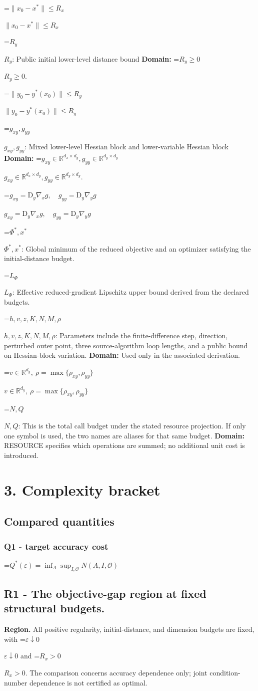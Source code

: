 \documentclass[10pt,a4paper]{article}
\newcommand{\AtlasMath}[1]{\par\begingroup\centering\setbox0=\hbox{$\displaystyle #1$}\ifdim\wd0>1.4\linewidth\typeout{ATLAS WIDE FORMULA: \the\wd0}\fi\ifdim\wd0>\linewidth\resizebox{\linewidth}{!}{\box0}\else\box0\fi\par\endgroup}
\newcommand{\AtlasInlineMath}[1]{\begingroup\setbox0=\hbox{$#1$}\ifdim\wd0>.4\linewidth\endgroup\AtlasMath{#1}\else\endgroup$#1$\fi}
\begin{document}
\AtlasInlineMath{\|x_0-x^*\|\le R_x}

\AtlasInlineMath{R_y}: Public initial lower-level distance bound \textbf{Domain:} \AtlasInlineMath{R_y\ge0}.

\AtlasInlineMath{\|y_0-y^*(x_0)\|\le R_y}

\AtlasInlineMath{g_{xy},g_{yy}}: Mixed lower-level Hessian block and lower-variable Hessian block \textbf{Domain:} \AtlasInlineMath{g_{xy}\in\mathbb R^{d_x\times d_y},g_{yy}\in\mathbb R^{d_y\times d_y}}.

\AtlasInlineMath{g_{xy}=\mathrm D_y\nabla_xg,\quad g_{yy}=\mathrm D_y\nabla_yg}

\AtlasInlineMath{\Phi^*,x^*}: Global minimum of the reduced objective and an optimizer satisfying the initial-distance budget.

\AtlasInlineMath{L_\Phi}: Effective reduced-gradient Lipschitz upper bound derived from the declared budgets.

\AtlasInlineMath{h,v,z,K,N,M,\rho}: Parameters include the finite-difference step, direction, perturbed outer point, three source-algorithm loop lengths, and a public bound on Hessian-block variation. \textbf{Domain:} Used only in the associated derivation.

\AtlasInlineMath{v\in\mathbb R^{d_y},\ \rho=\max\{\rho_{xy},\rho_{yy}\}}

\AtlasInlineMath{N,Q}: This is the total call budget under the stated resource projection. If only one symbol is used, the two names are aliases for that same budget. \textbf{Domain:} RESOURCE specifies which operations are summed; no additional unit cost is introduced.

\section{3. Complexity bracket}
\subsection{Compared quantities}
\subsubsection{Q1 - target accuracy cost}
\AtlasMath{Q^*(\varepsilon)=\inf_A\sup_{I,\mathcal O}N(A,I,\mathcal O)}
\subsection{R1 - The objective-gap region at fixed structural budgets.}
\textbf{Region.} All positive regularity, initial-distance, and dimension budgets are fixed, with \AtlasInlineMath{\varepsilon\downarrow0} and \AtlasInlineMath{R_x>0}. The comparison concerns accuracy dependence only; joint condition-number dependence is not certified as optimal.
\end{document}
